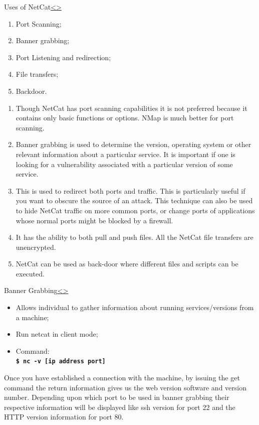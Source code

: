 \documentclass[12pt]{article}
\newcommand{\code}[1]{\texttt{\bfseries#1}}
\newenvironment{instructionblock}{\Large\bgroup}{\egroup}
\begin{document}
\pagebreak
\begin{slide}{Uses of NetCat}{\hyperref[slide 19]{\textless}\hyperref[slide 21]{\textgreater}}
\vskip 5pt
\begin{instructionblock}
\begin{enumerate}
\item Port Scanning;
\item Banner grabbing;
\item Port Listening and redirection;
\item File transfers;
\item Backdoor.
\end{enumerate}
\end{instructionblock}
\end{slide}
\begin{enumerate}
   \item Though NetCat has port scanning capabilities it is not preferred because it contains only basic functions or options. NMap is much better for port scanning.
   \item Banner grabbing is used to determine the version, operating system or other relevant information about a particular service. It is important if one is looking for a vulnerability associated with a particular version of some service.
   \item This is used to redirect both ports and traffic. This is particularly useful if you want to obscure the source of an attack. This technique can also be used to hide NetCat traffic on more common ports, or change ports of applications whose normal ports might be blocked by a firewall.
   \item It has the ability to both pull and push files. All the NetCat file transfers are unencrypted.
   \item NetCat can be used as back-door where different files and scripts can be executed.\cite{CEH} 
\end{enumerate}

\pagebreak
\begin{slide}{Banner Grabbing}{\hyperref[slide 20]{\textless}\hyperref[slide 22]{\textgreater}}
\vskip 5pt
\begin{instructionblock}
\begin{itemize}
\item Allows individual to gather information about running services/versions from a machine; 
\item Run netcat in client mode;
\item Command:\\
   \code{\$ nc -v [ip address port]}
\end{itemize}
\end{instructionblock}
\end{slide}
Once you have established a connection with the machine, by issuing the get command the return information gives us the web version software and version number. Depending upon which port to be used in banner grabbing their respective information will be displayed like ssh version for port 22 and the HTTP version information for port 80. \cite{Inetcat} 
\end{document}
